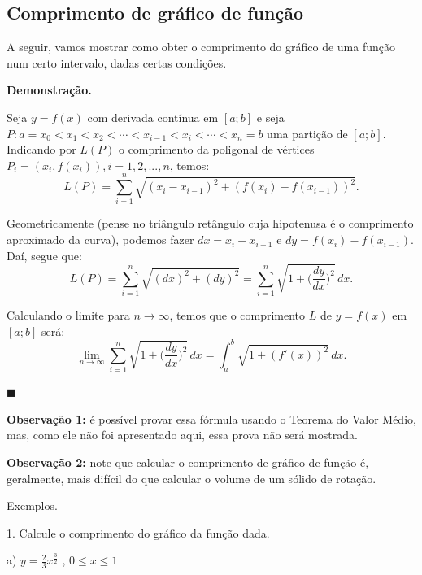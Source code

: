 \documentclass{article}
\begin{document}
{\begin{newpage}
\subsection{Comprimento de gráfico de função}
\hspace{12pt}A seguir, vamos mostrar como obter o comprimento do gráfico de uma função num certo intervalo, dadas certas condições.
\par
\textbf{Demonstração.}
\par
Seja $y=f(x)$ com derivada contínua em $[a;b]$ e seja $P:a = x_0 < x_1 < x_2 < \cdots < x_{i-1} < x_i < \cdots < x_n = b$ uma partição de $[a;b]$. Indicando por $L(P)$ o comprimento da poligonal de vértices $P_{i} = (x_{i}, f(x_i)), i=1,2, ... , n$, temos:
$$\displaystyle{L(P) = \sum_{i=1}^{n}\sqrt{(x_i - x_{i-1})^2 + (f(x_i) - f(x_{i-1}))^2}.}$$
\par Geometricamente (pense no triângulo retângulo cuja hipotenusa é o comprimento aproximado da curva), podemos fazer $dx = x_i - x_{i-1}$ e $dy = f(x_i) - f(x_{i-1})$. Daí, segue que:
$$\displaystyle{L(P) = \sum_{i=1}^{n} \sqrt{(dx)^2 + (dy)^2} = \sum_{i=1}^{n} \sqrt{1 + \Big(\frac{dy}{dx}\Big)^2}\, dx .}$$
\par Calculando o limite para $n\rightarrow \infty $, temos que o comprimento $L$ de $y=f(x)$ em $[a;b]$ será:
$$\displaystyle{\lim_{n\to\infty }\sum_{i=1}^{n} \sqrt{1 + \Big(\frac{dy}{dx}\Big)^2}\, dx = \int_{a}^{b} \sqrt{1 + (f'(x))^2}\, dx .}$$\begin{flushright}$\blacksquare$ \end{flushright}
\par\textbf{Observação 1:} é possível provar essa fórmula usando o Teorema do Valor Médio, mas, como ele não foi apresentado aqui, essa prova não será mostrada.
\par\textbf{Observação 2:} note que calcular o comprimento de gráfico de função é, geralmente, mais difícil do que calcular o volume de um sólido de rotação.
\par
\vspace{0.3cm}
Exemplos.
\par
\begin{flushleft}
1. Calcule o comprimento do gráfico da função dada.
\end{flushleft}
\par
\begin{multicols}{3}
\hspace{-15pt}a) $\displaystyle{y = \frac{2}{3}x^{\frac{3}{2}}}$ , $\displaystyle{0\leq x\leq 1}$\\

\end{multicols}
\end{newpage}}
\end{document}
